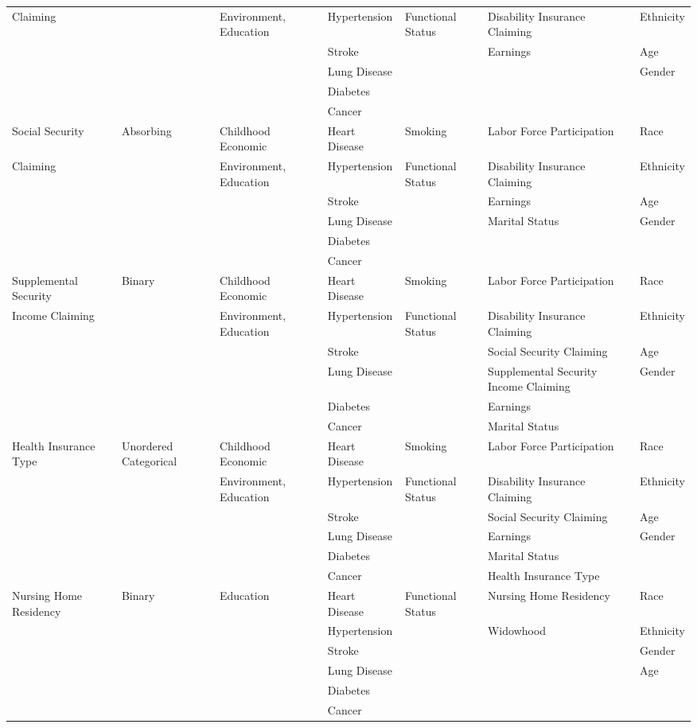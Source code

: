 \begin{table}
\begin{scriptsize}
\begin{tabular}{lllllll}
Claiming  & & Environment, Education & Hypertension & Functional Status & Disability Insurance Claiming  & Ethnicity \\
& & & Stroke & & Earnings & Age \\
& & & Lung Disease &   &  & Gender \\
& & & Diabetes &  &  &  \\
& & & Cancer &  & & \\
\midrule			
Social Security  & Absorbing & Childhood Economic & Heart Disease & Smoking & Labor Force Participation & Race \\
Claiming & & Environment, Education & Hypertension & Functional Status & Disability Insurance Claiming  & Ethnicity \\
& & & Stroke & & Earnings & Age \\
& & & Lung Disease &   & Marital Status & Gender \\
& & & Diabetes &  &  &  \\
& & & Cancer &  & & \\
\midrule			
Supplemental Security & Binary & Childhood Economic  & Heart Disease & Smoking & Labor Force Participation & Race \\
Income Claiming  & & Environment, Education & Hypertension & Functional Status & Disability Insurance Claiming  & Ethnicity \\
& & & Stroke & & Social Security Claiming & Age \\
& & & Lung Disease &   & Supplemental Security Income Claiming  & Gender \\
& & & Diabetes &  & Earnings &  \\
& & & Cancer &  & Marital Status & \\
\midrule			
Health Insurance Type & Unordered Categorical & Childhood Economic & Heart Disease & Smoking & Labor Force Participation & Race \\
& & Environment, Education & Hypertension & Functional Status & Disability Insurance Claiming  & Ethnicity \\
& & & Stroke & & Social Security Claiming & Age \\
& & & Lung Disease &   & Earnings & Gender \\
& & & Diabetes &  & Marital Status &  \\
& & & Cancer &  & Health Insurance Type & \\
\midrule
Nursing Home Residency & Binary & Education & Heart Disease & Functional Status & Nursing Home Residency & Race \\
& & & Hypertension & & Widowhood & Ethnicity \\
& & & Stroke & &   & Gender \\
& & & Lung Disease  & & & Age \\
&  & & Diabetes & & & \\
&  & & Cancer & & & \\
\bottomrule
\end{tabular}
\end{scriptsize}
\end{table}

